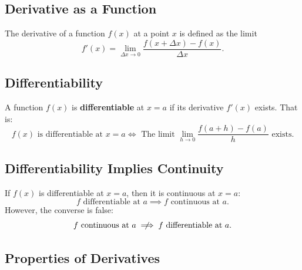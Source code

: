 \documentclass[a4paper,11pt]{article}
\begin{document}


\subsection{Derivative as a Function}

\begin{tcolorbox}
    The derivative of a function \( f(x) \) at a point \( x \) is defined as the limit
    \[
    f'(x) = \lim_{\Delta x \to 0} \frac{f(x + \Delta x) - f(x)}{\Delta x}.
    \]
\end{tcolorbox}




\subsection{Differentiability}

\begin{tcolorbox}
    A function \( f(x) \) is \textbf{differentiable} at \( x = a \) if its derivative \( f'(x) \) exists. That is:  
    \[
    f(x) \text{ is differentiable at } x = a \iff \text{ The limit } \lim\limits_{h \to 0} \frac{f(a+h) - f(a)}{h} \text{ exists.}
    \]
\end{tcolorbox}




\subsection{Differentiability Implies Continuity}

\begin{tcolorbox}
    If \( f(x) \) is differentiable at \( x = a \), then it is continuous at \( x = a: \)
    \[
    f \text{ differentiable at } a \implies f \text{ continuous at } a.
    \]
    However, the converse is false:
    \[
    f \text{ continuous at } a \centernot\implies f \text{ differentiable at } a.
    \]
\end{tcolorbox}




\subsection{Properties of Derivatives}
\end{document}
